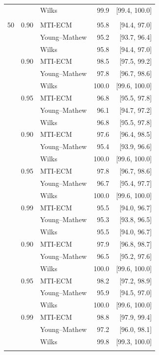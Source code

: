 \begin{longtable}{@{}rrlrr@{}}
 &  & Wilks & 99.9 & [99.4, 100.0] \\
\addlinespace[0.2em]
\multicolumn{5}{@{}l}{\textit{Student t(3)}}\\
50 & 0.90 & MTI-ECM & 95.8 & [94.4, 97.0] \\
 &  & Young--Mathew & 95.2 & [93.7, 96.4] \\
 &  & Wilks & 95.8 & [94.4, 97.0] \\
\addlinespace[0.2em]
100 & 0.90 & MTI-ECM & 98.5 & [97.5, 99.2] \\
 &  & Young--Mathew & 97.8 & [96.7, 98.6] \\
 &  & Wilks & 100.0 & [99.6, 100.0] \\
\addlinespace[0.2em]
100 & 0.95 & MTI-ECM & 96.8 & [95.5, 97.8] \\
 &  & Young--Mathew & 96.1 & [94.7, 97.2] \\
 &  & Wilks & 96.8 & [95.5, 97.8] \\
\addlinespace[0.2em]
500 & 0.90 & MTI-ECM & 97.6 & [96.4, 98.5] \\
 &  & Young--Mathew & 95.4 & [93.9, 96.6] \\
 &  & Wilks & 100.0 & [99.6, 100.0] \\
\addlinespace[0.2em]
500 & 0.95 & MTI-ECM & 97.8 & [96.7, 98.6] \\
 &  & Young--Mathew & 96.7 & [95.4, 97.7] \\
 &  & Wilks & 100.0 & [99.6, 100.0] \\
\addlinespace[0.2em]
500 & 0.99 & MTI-ECM & 95.5 & [94.0, 96.7] \\
 &  & Young--Mathew & 95.3 & [93.8, 96.5] \\
 &  & Wilks & 95.5 & [94.0, 96.7] \\
\addlinespace[0.2em]
1000 & 0.90 & MTI-ECM & 97.9 & [96.8, 98.7] \\
 &  & Young--Mathew & 96.5 & [95.2, 97.6] \\
 &  & Wilks & 100.0 & [99.6, 100.0] \\
\addlinespace[0.2em]
1000 & 0.95 & MTI-ECM & 98.2 & [97.2, 98.9] \\
 &  & Young--Mathew & 95.9 & [94.5, 97.0] \\
 &  & Wilks & 100.0 & [99.6, 100.0] \\
\addlinespace[0.2em]
1000 & 0.99 & MTI-ECM & 98.8 & [97.9, 99.4] \\
 &  & Young--Mathew & 97.2 & [96.0, 98.1] \\
 &  & Wilks & 99.8 & [99.3, 100.0] \\
\addlinespace[0.2em]

\end{longtable}
